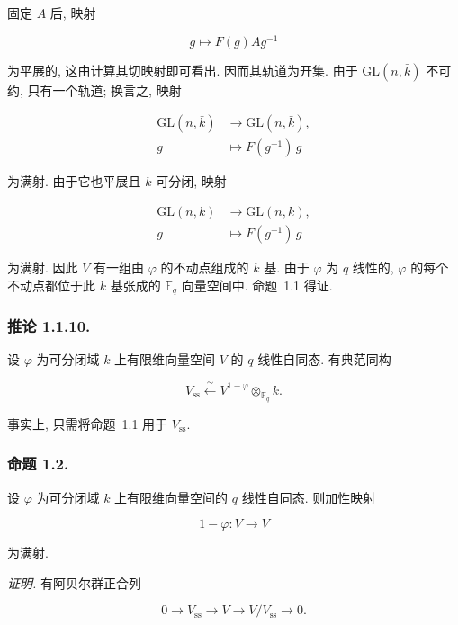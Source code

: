 固定 $A$ 后, 映射

\begin{equation}\tag{1.1.7}
g\longmapsto F(g)Ag^{-1}
\end{equation}

为平展的, 这由计算其切映射即可看出. 因而其轨道为开集.
由于 $\mathrm{GL}(n,\bar k)$ 不可约, 只有一个轨道; 换言之, 映射

\begin{equation}\tag{1.1.8}
\begin{aligned}
\mathrm{GL}(n,\bar k)&\longrightarrow\mathrm{GL}(n,\bar k),\\
g&\longmapsto F(g^{-1})\,g
\end{aligned}
\end{equation}

为满射. 由于它也平展且 $k$ 可分闭, 映射

\begin{equation}\tag{1.1.9}
\begin{aligned}
\mathrm{GL}(n,k)&\longrightarrow\mathrm{GL}(n,k),\\
g&\longmapsto F(g^{-1})\,g
\end{aligned}
\end{equation}

为满射. 因此 $V$ 有一组由 $\varphi$ 的不动点组成的 $k$ 基.
由于 $\varphi$ 为 $q$ 线性的, $\varphi$ 的每个不动点都位于此 $k$ 基张成的
$\mathbb F_q$ 向量空间中. 命题~1.1 得证.

\subsubsection*{推论 1.1.10.}
设 $\varphi$ 为可分闭域 $k$ 上有限维向量空间 $V$ 的 $q$ 线性自同态.
有典范同构

\begin{equation}\tag{1.1.11}
V_{\mathrm{ss}}\xleftarrow{\ \sim\ }
V^{1-\varphi}\otimes_{\mathbb F_q}k.
\end{equation}

事实上, 只需将命题~1.1 用于 $V_{\mathrm{ss}}$.

\subsubsection*{命题 1.2.}
设 $\varphi$ 为可分闭域 $k$ 上有限维向量空间的 $q$ 线性自同态. 则加性映射

\[
1-\varphi:V\longrightarrow V
\]

为满射.

\medskip
\noindent\emph{证明.}
有阿贝尔群正合列

\[
0\longrightarrow V_{\mathrm{ss}}\longrightarrow V
\longrightarrow V/V_{\mathrm{ss}}\longrightarrow0.
\]
